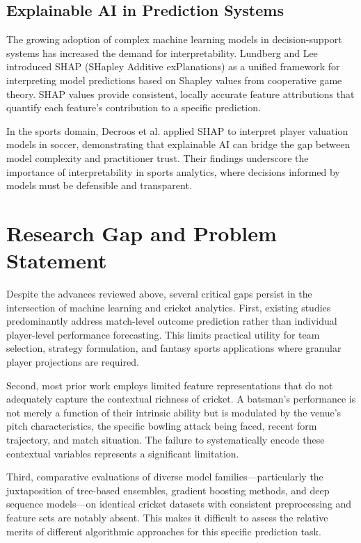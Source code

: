 \documentclass[conference]{IEEEtran}
\begin{document}
\subsection{Explainable AI in Prediction Systems}
The growing adoption of complex machine learning models in decision-support systems has increased the demand for interpretability. Lundberg and Lee \cite{ref11} introduced SHAP (SHapley Additive exPlanations) as a unified framework for interpreting model predictions based on Shapley values from cooperative game theory. SHAP values provide consistent, locally accurate feature attributions that quantify each feature's contribution to a specific prediction.

In the sports domain, Decroos et al. \cite{ref12} applied SHAP to interpret player valuation models in soccer, demonstrating that explainable AI can bridge the gap between model complexity and practitioner trust. Their findings underscore the importance of interpretability in sports analytics, where decisions informed by models must be defensible and transparent.

\section{Research Gap and Problem Statement}
Despite the advances reviewed above, several critical gaps persist in the intersection of machine learning and cricket analytics. First, existing studies predominantly address match-level outcome prediction rather than individual player-level performance forecasting. This limits practical utility for team selection, strategy formulation, and fantasy sports applications where granular player projections are required.

Second, most prior work employs limited feature representations that do not adequately capture the contextual richness of cricket. A batsman's performance is not merely a function of their intrinsic ability but is modulated by the venue's pitch characteristics, the specific bowling attack being faced, recent form trajectory, and match situation. The failure to systematically encode these contextual variables represents a significant limitation.

Third, comparative evaluations of diverse model families—particularly the juxtaposition of tree-based ensembles, gradient boosting methods, and deep sequence models—on identical cricket datasets with consistent preprocessing and feature sets are notably absent. This makes it difficult to assess the relative merits of different algorithmic approaches for this specific prediction task.
\end{document}
